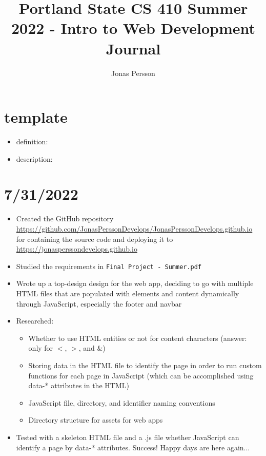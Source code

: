 \documentclass{article}
\begin{document}
	
	\title { Portland State CS 410 Summer 2022 - Intro to Web Development Journal }
	\author {Jonas Persson}
	\maketitle
	
	\newpage

\section*{template}
\begin{itemize}
	\item definition:
	\item description:
\end{itemize}

\section*{7/31/2022}
\begin{itemize}
	\item Created the GitHub repository \newline \href{https://github.com/JonasPerssonDevelops/JonasPerssonDevelops.github.io}{https://github.com/JonasPerssonDevelops/JonasPerssonDevelops.github.io} \newline 
	for containing the source code and deploying it to \newline \href{https://jonasperssondevelops.github.com}{https://jonasperssondevelops.github.io}
	\item Studied the requirements in \texttt{Final Project - Summer.pdf}
	\item Wrote up a top-design design for the web app, deciding to go with multiple HTML files that are populated with elements and content dynamically through JavaScript, especially the footer and navbar
	\item Researched:
		\begin{itemize} 
        	\item Whether to use HTML entities or not for content characters (answer: only for $<$, $>$, and \&)
        	\item Storing data in the HTML file to identify the page in order to run custom functions for each page in JavaScript (which can be accomplished using data-* attributes in the HTML)
        	\item JavaScript file, directory, and identifier naming conventions
        	\item Directory structure for assets for web apps
		\end{itemize}
		\item Tested with a skeleton HTML file and a .js file whether JavaScript can identify a page by data-* attributes. Success! Happy days are here again...

\end{itemize}
\end{document}
